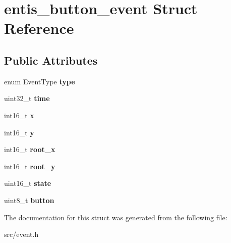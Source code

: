 \hypertarget{structentis__button__event}{}\section{entis\+\_\+button\+\_\+event Struct Reference}
\label{structentis__button__event}
\subsection*{Public Attributes}
\begin{DoxyCompactItemize}
\item 
\mbox{\label{structentis__button__event_a65fb53f9490f5a61daa066615a237d2f}} 
enum Event\+Type {\bfseries type}
\item 
\mbox{\label{structentis__button__event_a3c1b558031ee2e1cd59bccb263735f15}} 
uint32\+\_\+t {\bfseries time}
\item 
\mbox{\label{structentis__button__event_ad619f63529bda2ed6be07b6759355e4f}} 
int16\+\_\+t {\bfseries x}
\item 
\mbox{\label{structentis__button__event_aba7a0e9652a27aca0b4df5d8cab6e8e2}} 
int16\+\_\+t {\bfseries y}
\item 
\mbox{\label{structentis__button__event_a102671036f50da00a4dcdf8a8af3d93b}} 
int16\+\_\+t {\bfseries root\+\_\+x}
\item 
\mbox{\label{structentis__button__event_a2adbd682bf1448a5afe2caab9529d404}} 
int16\+\_\+t {\bfseries root\+\_\+y}
\item 
\mbox{\label{structentis__button__event_a2c678ba8ec98be1b0c048a234914fbe1}} 
uint16\+\_\+t {\bfseries state}
\item 
\mbox{\label{structentis__button__event_aa7889c0012ae8607f7d2d1f9a3e5c40c}} 
uint8\+\_\+t {\bfseries button}
\end{DoxyCompactItemize}


The documentation for this struct was generated from the following file\+:\begin{DoxyCompactItemize}
\item 
src/event.\+h\end{DoxyCompactItemize}
